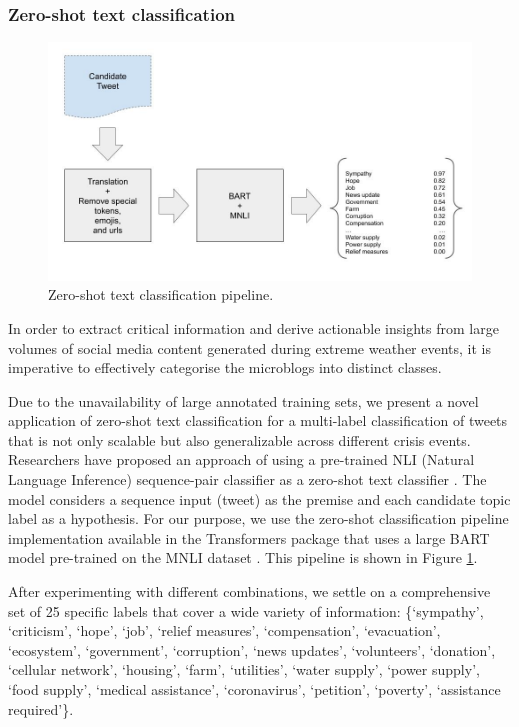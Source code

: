 \documentclass{article}
\begin{document}
\subsubsection{Zero-shot text classification}

\begin{figure}
    \includegraphics[width=\linewidth, trim=0 50 0 75]{../figures/figures_zstc_pipeline.jpg}
  \caption{Zero-shot text classification pipeline.}
  \label{fig:zstcpipeline}
\end{figure}

In order to extract critical information and derive actionable insights from large volumes of social
media content generated during extreme weather events, it is imperative to effectively categorise
the microblogs into distinct classes.

Due to the unavailability of large annotated training sets, we present a novel application of
zero-shot text classification for a multi-label classification of tweets that is not only scalable
but also generalizable across different crisis events. Researchers have proposed an approach of
using a pre-trained NLI (Natural Language Inference) sequence-pair classifier as a zero-shot text
classifier \cite{yin2019benchmarking}. The model considers a sequence input (tweet) as the premise
and each candidate topic label as a hypothesis. For our purpose, we use the zero-shot classification
pipeline implementation available in the Transformers package that uses a large BART model
\cite{lewis2019bart} pre-trained on the MNLI dataset \cite{N18-1101}. This pipeline is shown in
Figure \ref{fig:zstcpipeline}.
    
After experimenting with different combinations, we settle on a comprehensive set of 25 specific
labels that cover a wide variety of information: \{`sympathy', `criticism', `hope', `job', `relief
measures', `compensation', `evacuation', `ecosystem', `government', `corruption', `news updates',
`volunteers', `donation', `cellular network', `housing', `farm', `utilities', `water supply', `power
supply', `food supply', `medical assistance', `coronavirus', `petition', `poverty', `assistance
required’\}.
    
\end{document}
